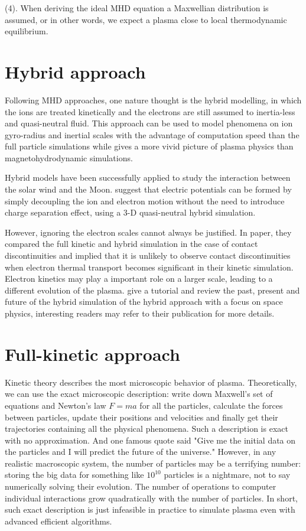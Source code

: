 (4). When deriving the ideal MHD equation a Maxwellian distribution is assumed, or in other words, we expect a plasma close to local thermodynamic equilibrium.


\section{Hybrid approach}

Following MHD approaches, one nature thought is the hybrid modelling, in which the ions are treated kinetically and the electrons are still assumed to inertia-less and quasi-neutral fluid. This approach can be used to model phenomena on ion gyro-radius and inertial scales with the advantage of computation speed than the full particle simulations while gives a more vivid picture of plasma physics than magnetohydrodynamic simulations.

Hybrid models have been successfully applied to study the interaction between the solar wind and the Moon. \citep{jarvinenVerticalElectricFields2014} suggest that electric potentials can be formed by simply decoupling the ion and electron motion without the need to introduce charge separation effect, using a 3-D quasi-neutral hybrid simulation.

However, ignoring the electron scales cannot always be justified. In \cite{lapentaContactDiscontinuitiesCollisionless1996} paper, they compared the full kinetic and hybrid simulation in the case of contact discontinuities and implied that it is unlikely to observe contact discontinuities when electron thermal transport becomes significant in their kinetic simulation. Electron kinetics may play a important role on a larger scale, leading to a different evolution of the plasma. \cite{winskeHybridSimulationCodes2003} give a tutorial and review the past, present and future of the hybrid simulation of the hybrid approach with a focus on space physics, interesting readers may refer to their publication for more details.


\section{Full-kinetic approach}

Kinetic theory describes the most microscopic behavior of plasma. Theoretically, we can use the exact microscopic description: write down Maxwell's set of equations and Newton's law $F=ma$ for all the particles, calculate the forces between particles, update their positions and velocities and finally get their trajectories containing all the physical phenomena. Such a description is exact with no approximation. And one famous quote said "Give me the initial data on the particles and I will predict the future of the universe." However, in any realistic macroscopic system, the number of particles may be a terrifying number: storing the big data for something like $10^{10}$ particles is a nightmare, not to say numerically solving their evolution. The number of operations to computer individual interactions grow quadratically with the number of particles. In short, such exact description is just infeasible in practice to simulate plasma even with advanced efficient algorithms.

